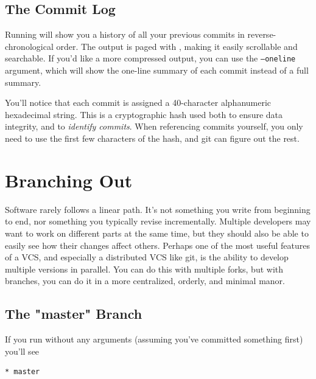 \documentclass[11pt,letterpaper,twoside]{report}
\begin{document}
\section{The Commit Log}

Running  will show you a history of all your previous commits in
reverse-chronological order. The output is paged with , making it
easily scrollable and searchable. If you'd like a more compressed output, you
can use the \texttt{--oneline} argument, which will show the one-line summary of
each commit instead of a full summary.

You'll notice that each commit is assigned a 40-character alphanumeric
hexadecimal string. This is a cryptographic hash used both to ensure data
integrity, and to \emph{identify commits}. When referencing commits yourself,
you only need to use the first few characters of the hash, and git can figure
out the rest.


\chapter{Branching Out}

Software rarely follows a linear path. It's not something you write from
beginning to end, nor something you typically revise incrementally. Multiple
developers may want to work on different parts at the same time, but they should
also be able to easily see how their changes affect others. Perhaps one of the
most useful features of a VCS, and especially a distributed VCS like git, is the
ability to develop multiple versions in parallel. You can do this with multiple
forks, but with branches, you can do it in a more centralized, orderly, and
minimal manor.

\section{The "master" Branch}

If you run  without any arguments (assuming you've committed
something first) you'll see

\begin{lstlisting}[numbers=none]
* master
\end{lstlisting}
\end{document}
